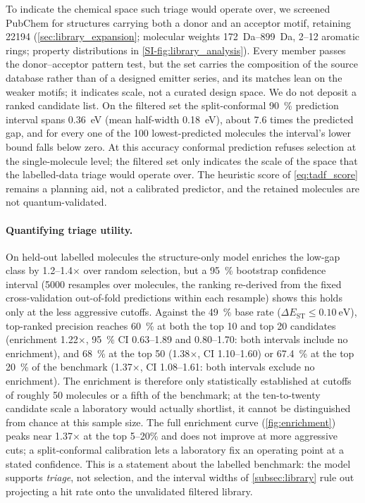 To indicate the chemical space such triage would operate over, we screened PubChem for
structures carrying both a donor and an acceptor motif, retaining \num{22194}
(\cref{sec:library_expansion}; molecular weights \qtyrange{172}{899}{\dalton},
\numrange{2}{12} aromatic rings; property distributions in
\cref{SI-fig:library_analysis}). Every member passes the donor--acceptor pattern test,
but the set carries the composition of the source database rather than of a designed
emitter series, and its matches lean on the weaker motifs; it indicates scale, not a
curated design space. We do not deposit a
ranked candidate list. On the filtered set the split-conformal
\qty{90}{\percent} prediction interval spans \qty{0.36}{\electronvolt} (mean
half-width \qty{0.18}{\electronvolt}), about \num{7.6} times the predicted gap, and for
every one of the \num{100} lowest-predicted molecules the interval's lower bound
falls below zero. At this accuracy conformal prediction refuses selection at the
single-molecule level; the filtered set only indicates the scale of the space that the
labelled-data triage would operate over. The heuristic score of
\cref{eq:tadf_score} remains a planning aid, not a calibrated predictor, and the
retained molecules are not quantum-validated.

\paragraph{Quantifying triage utility.}
On held-out labelled molecules the structure-only model enriches the low-gap
class by \numrange{1.2}{1.4}$\times$ over random selection, but a
\qty{95}{\percent} bootstrap confidence interval (\num{5000} resamples over
molecules, the ranking re-derived from the fixed cross-validation out-of-fold predictions within
each resample) shows this holds only at the less aggressive cutoffs. Against the
\qty{49}{\percent} base rate ($\Delta E_\text{ST} \le \qty{0.10}{\electronvolt}$),
top-ranked precision reaches \qty{60}{\percent} at both the top \num{10} and top
\num{20} candidates (enrichment \num{1.22}$\times$, \qty{95}{\percent} CI
\numrange{0.63}{1.89} and \numrange{0.80}{1.70}: both intervals include no
enrichment), and \qty{68}{\percent} at the top \num{50} (\num{1.38}$\times$, CI
\numrange{1.10}{1.60}) or \qty{67.4}{\percent} at the top \qty{20}{\percent} of the
benchmark (\num{1.37}$\times$, CI \numrange{1.08}{1.61}: both intervals exclude no
enrichment). The enrichment is therefore only statistically established at cutoffs
of roughly \num{50} molecules or a fifth of the benchmark; at the ten-to-twenty
candidate scale a laboratory would actually shortlist, it cannot be distinguished
from chance at this sample size. The full enrichment curve
(\cref{fig:enrichment}) peaks near \num{1.37}$\times$ at the top
\numrange{5}{20}\% and does not improve at more aggressive cuts; a split-conformal
calibration lets a laboratory fix an operating point at a stated confidence. This
is a statement about the labelled benchmark: the model supports \emph{triage},
not selection, and the interval widths of \cref{subsec:library} rule out
projecting a hit rate onto the unvalidated filtered library.

